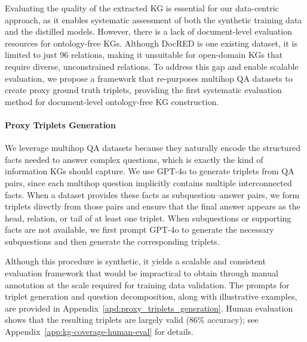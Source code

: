 \documentclass{article} %
\begin{document}
Evaluating the quality of the extracted KG is essential for our data-centric approach, as it enables systematic assessment of both the synthetic training data and the distilled models. However, there is a lack of document-level evaluation resources for ontology-free KGs. Although DocRED \citep{yao-etal-2019-docred} is one existing dataset, it is limited to just 96 relations, making it unsuitable for open-domain KGs that require diverse, unconstrained relations. To address this gap and enable scalable evaluation, we propose a framework that re-purposes multihop QA datasets to create proxy ground truth triplets, providing the first systematic evaluation method for document-level ontology-free KG construction.

\paragraph{Proxy Triplets Generation}
We leverage multihop QA datasets because they naturally encode the structured facts needed to answer complex questions, which is exactly the kind of information KGs should capture. We use GPT-4o to generate triplets from QA pairs, since each multihop question implicitly contains multiple interconnected facts. When a dataset provides these facts as subquestion–answer pairs, we form triplets directly from those pairs and ensure that the final answer appears as the head, relation, or tail of at least one triplet. When subquestions or supporting facts are not available, we first prompt GPT-4o to generate the necessary subquestions and then generate the corresponding triplets.

Although this procedure is synthetic, it yields a scalable and consistent evaluation framework that would be impractical to obtain through manual annotation at the scale required for training data validation. The prompts for triplet generation and question decomposition, along with illustrative examples, are provided in Appendix~\ref{apd:proxy_triplets_generation}. Human evaluation shows that the resulting triplets are largely valid (86\% accuracy); see Appendix~\ref{app:kg-coverage-human-eval} for details.
\end{document}
